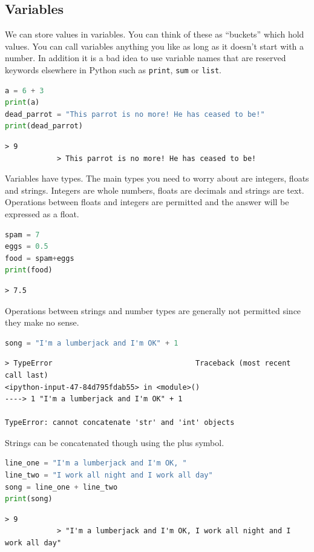 	\subsection{Variables}\label{types}
		We can store values in variables. You can think of these as ``buckets'' which hold values. You can call variables anything you like as long as it doesn't start with a number. In addition it is a bad idea to use variable names that are reserved keywords elsewhere in Python such as \texttt{print}, \texttt{sum} or \texttt{list}. 
		\begin{lstlisting}[language=Python]
a = 6 + 3
print(a)
dead_parrot = "This parrot is no more! He has ceased to be!"
print(dead_parrot)\end{lstlisting}
		\begin{verbatim}> 9
			> This parrot is no more! He has ceased to be!
		\end{verbatim}
		Variables have types. The main types you need to worry about are integers, floats and strings. Integers are whole numbers, floats are decimals and strings are text. Operations between floats and integers are permitted and the answer will be expressed as a float.
		\begin{lstlisting}[language=Python]
spam = 7
eggs = 0.5
food = spam+eggs
print(food)
\end{lstlisting}
		\begin{verbatim}> 7.5\end{verbatim}	
		Operations between strings and number types are generally not permitted since they make no sense.
		\begin{lstlisting}[language=Python]
song = "I'm a lumberjack and I'm OK" + 1\end{lstlisting}
		\begin{verbatim}> TypeError                                 Traceback (most recent call last)
<ipython-input-47-84d795fdab55> in <module>()
----> 1 "I'm a lumberjack and I'm OK" + 1

TypeError: cannot concatenate 'str' and 'int' objects\end{verbatim}

Strings can be concatenated though using the plus symbol.	
		\begin{lstlisting}[language=Python]
line_one = "I'm a lumberjack and I'm OK, "
line_two = "I work all night and I work all day"
song = line_one + line_two
print(song)\end{lstlisting}
		\begin{verbatim}> 9
			> "I'm a lumberjack and I'm OK, I work all night and I work all day"
		\end{verbatim}

